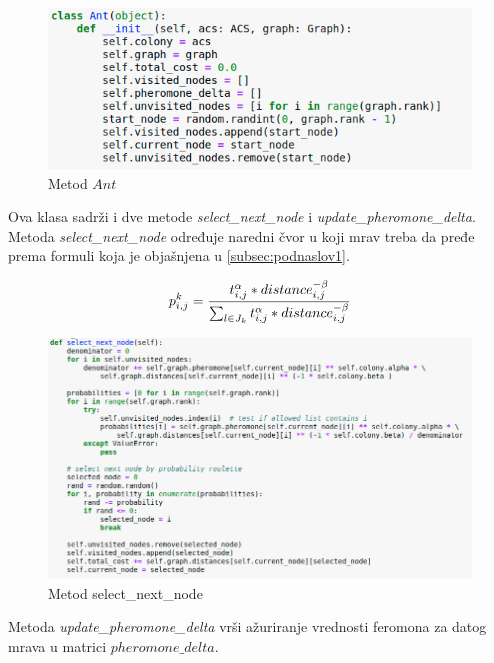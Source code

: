 \documentclass[a4paper]{article}
\begin{document}
\begin{figure}[h!]
\begin{center}
\includegraphics[width=1\columnwidth]{slika5.png}
\end{center}
\caption{Metod $Ant$}
\label{fig:slika5}
\end{figure}

Ova klasa sadrži i dve metode \textit{select\_next\_node} i \textit{update\_pheromone\_delta}.
Metoda \textit{select\_next\_node} određuje naredni čvor u koji mrav treba da pređe prema formuli koja je objašnjena u \ref{subsec:podnaslov1}. 

\begin{equation}\label{1}
p_{i,j}^k = {t_{i,j}^\alpha * distance_{i,j}^{-\beta} \over \sum_{l \in J_k}^{} t_{i,j}^\alpha * distance_{i,j}^{-\beta}}
\end{equation}

\begin{figure}[h!]
\begin{center}
\includegraphics[width=1\columnwidth]{slika6.png}
\end{center}
\caption{Metod select\_next\_node}
\label{fig:slika5}
\end{figure}

Metoda \textit{update\_pheromone\_delta} vrši ažuriranje vrednosti feromona
za datog mrava u matrici $pheromone\_delta$.
\end{document}
